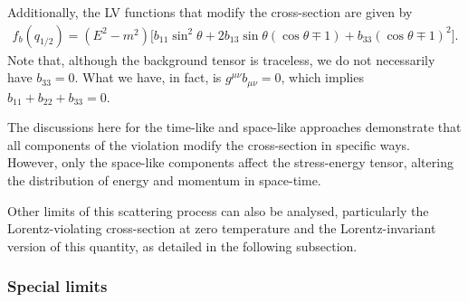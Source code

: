\documentclass[11pt,showpacs,preprintnumbers,amsmath,amssymb,prd,nofootinbib,superscriptaddress]{revtex4-2}
\begin{document}
Additionally, the { LV functions that modify the cross-section are given by
\begin{eqnarray}
    f_b(q_{1/2})=(E^2-m^2)\biggl[b_{11}\sin^2{\theta}+2b_{13}\sin{\theta}(\cos{\theta}\mp1)+b_{33}(\cos{\theta}\mp1)^2\biggr].
\end{eqnarray}}
Note that, although the background tensor is traceless, we do not necessarily have $b_{33}=0$. What we have, in fact, is $g^{\mu\nu}b_{\mu\nu}=0$,  which implies $b_{11}+b_{22}+b_{33}=0$.

The discussions here for the time-like and space-like approaches demonstrate that all components of the violation modify the cross-section in specific ways. However, only the space-like components affect the stress-energy tensor, altering the distribution of energy and momentum in space-time.

Other limits of this scattering process can also be analysed, particularly the Lorentz-violating cross-section at zero temperature and the Lorentz-invariant version of this quantity, as detailed in the following subsection.

\subsubsection{Special limits}
\end{document}
